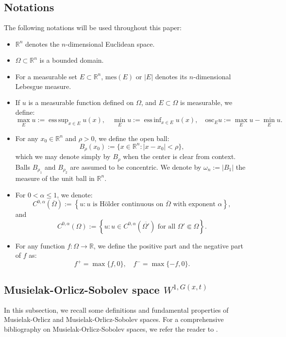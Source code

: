 \documentclass[10pt,reqno]{amsart}
\newcommand *\w{^\wedge}
\theoremstyle{definition}
\numberwithin{equation}{section}
\begin{document}
\subsection{Notations}
The following notations will be used throughout this paper:
\begin{itemize}
    \item $\mathbb{R}^n$ denotes the $n$-dimensional Euclidean space.
    \item $\Omega \subset \mathbb{R}^n$ is a bounded domain.
    \item For a measurable set $E \subset \mathbb{R}^n$, $\mathrm{mes}(E)$ or $|E|$ denotes its $n$-dimensional Lebesgue measure.
    \item If $u$ is a measurable function defined on $\Omega$, and $E \subset \Omega$ is measurable, we define:
   \begin{equation}\label{os1}
    \max_E u := \mathop{\mathrm{ess\,sup}}_{x \in E} u(x), \quad
    \min_E u := \mathop{\mathrm{ess\,inf}}_{x \in E} u(x), \quad
    \mathrm{osc}_E u := \max_E u - \min_E u.
    \end{equation}
    \item For any $x_0 \in \mathbb{R}^n$ and $\rho > 0$, we define the open ball:
    \[
    B_\rho(x_0) := \{x \in \mathbb{R}^n : |x - x_0| < \rho\},
    \]
    which we may denote simply by $B_\rho$ when the center is clear from context. Balls $B_{\rho_1}$ and $B_{\rho_2}$ are assumed to be concentric. We denote by $\omega_n := |B_1|$ the measure of the unit ball in $\mathbb{R}^n$.
    \item For $0 < \alpha \leq 1$, we denote:
    \[
    C^{0,\alpha}(\overline{\Omega}) := \left\{ u : u \text{ is Hölder continuous on } \overline{\Omega} \text{ with exponent } \alpha \right\},
    \]
    and
    \[
    C^{0,\alpha}(\Omega) := \left\{ u : u \in C^{0,\alpha}(\overline{\Omega'}) \text{ for all } \Omega' \Subset \Omega \right\}.
    \]
    \item For any function \( f : \Omega \rightarrow \mathbb{R} \), we define the positive part and the negative part of \( f \) as:
\[
f^+ = \max\{f, 0\}, \quad f^- = \max\{-f, 0\}.
\]

\end{itemize}
\subsection{Musielak-Orlicz-Sobolev space \texorpdfstring{$W^{1,G(x,t)}$}{W1G(x,t)}}\label{sec2}
In this subsection, we recall some definitions and fundamental properties of Musielak-Orlicz and Musielak-Orlicz-Sobolev spaces. 
For a comprehensive bibliography on Musielak-Orlicz-Sobolev spaces, we refer the reader to \cite{Ala2, TD, Chlebicka2021, Diening2011, Harjulehto2019, Fan2012a, Fan2012b, Musielak1983, TS1, TS11, TS12, TS2, TS3, TS4, TS5, TS6, TS7, TS8, TS9, TS10}.
\end{document}
